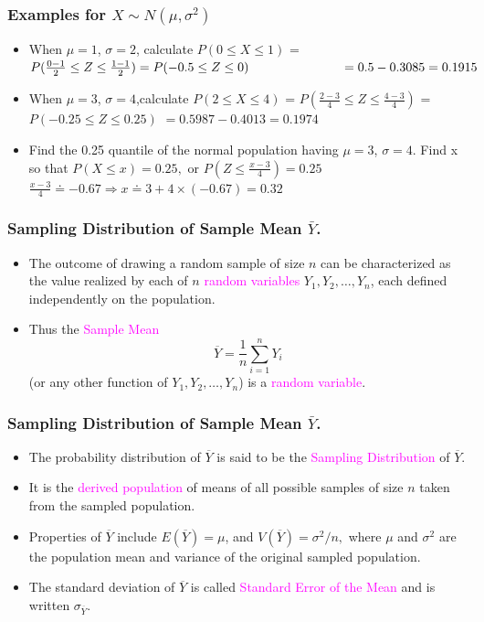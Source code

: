\documentclass[xcolor=dvipsnames,12pt]{beamer}
\begin{document}
\begin{frame}
\frametitle{Examples for $X \sim N(\mu, \sigma^2)$}
\begin{itemize}
\item When $\mu = 1$, $\sigma = 2$, calculate $P(0 \leq X \leq 1)$
      = $P(\frac{0-1}{2} \leq Z \leq \frac{1-1}{2})= P(-0.5 \leq Z \leq 0)
   \hspace*{1in} = 0.5-0.3085=0.1915$ 
\item When $\mu = 3$, $\sigma=4$,calculate $P(2 \leq X \leq 4)$
      \hspace*{1in} = $P(\frac{2-3}{4} \leq Z \leq \frac{4-3}{4})$
       = $P(- 0.25 \leq Z \leq 0.25)$
      \hspace*{1in} $= 0.5987-0.4013=0.1974$
\item Find the 0.25 quantile of the normal population having
      $\mu = 3$, $\sigma = 4$.
    Find x so that $P(X \leq x) = 0.25,$ or $P(Z \leq \frac{x-3}{4}) = 0.25$
      \hspace*{1in}$\frac{x-3}{4} \doteq -0.67 \Rightarrow x \doteq 3
             + 4 \times (-0.67)= 0.32$
\end{itemize}
\end{frame}


\begin{frame}
\frametitle{Sampling Distribution of Sample Mean $\bar{Y}$.}
\begin{itemize}
\item The outcome of drawing a random sample of size $n$
can be characterized as the value realized by each of $n$ 
\textcolor{magenta}{random variables} $Y_1, Y_2, \ldots, Y_n$, each defined 
independently on the population. 
\item Thus the \textcolor{magenta}{Sample Mean} 
$$
  \overline{Y} = \frac1n \sum_{i=1}^n Y_i
$$
(or any other function of  $Y_1, Y_2, \ldots, Y_n$) is a \textcolor{magenta}{random variable}. 
\end{itemize}
\end{frame}



\begin{frame}
\frametitle{Sampling Distribution of Sample Mean $\bar{Y}$.}
\begin{itemize}
\item The probability distribution of $\overline{Y}$ is 
said to be the \textcolor{magenta}{Sampling Distribution} of $\overline{Y}$. 
\item It is the \textcolor{magenta}{derived population} of means of all possible samples
of size $n$ taken from the sampled population.
\item Properties of $\overline{Y}$ include $E(\overline{Y}) = \mu$, and
$V(\overline{Y}) = \sigma^2/n,$ 
where $\mu$ and $\sigma^2$ are
the population mean and variance of the original sampled population.
\item The standard deviation of $\overline{Y}$ is called
\textcolor{magenta}{Standard Error of the Mean} and is written $\sigma_{\overline{Y}}$.
\end{itemize}
\end{frame}
\end{document}
